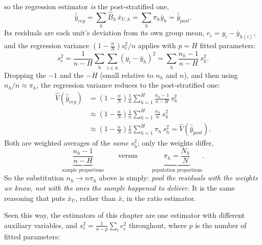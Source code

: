 \documentclass[
  letterpaper,
  DIV=11,
  numbers=noendperiod]{scrreprt}
\renewcommand{\[}{\begin{equation}}
\renewcommand{\]}{\end{equation}}
\begin{document}
so the regression estimator \emph{is} the post-stratified one, \[
\hat{\bar y}_{reg} = \sum_h \hat B_h\,\bar x_{U,h} = \sum_h \pi_h\bar y_h = \hat{\bar y}_{post} .
\] Its residuals are each unit's deviation from its own group mean,
\(e_i = y_i - \bar y_{h(i)}\), and the regression variance
\(\left(1 - \frac nN\right)s_e^2/n\) applies with \(p = H\) fitted
parameters: \[
s_e^2 = \frac{1}{n-H}\sum_h\sum_{i \in h}\left(y_i - \bar y_h\right)^2 = \sum_h \frac{n_h - 1}{n-H}\,s_h^2 .
\] Dropping the \(-1\) and the \(-H\) (small relative to \(n_h\) and
\(n\)), and then using \(n_h/n \approx \pi_h\), the regression variance
reduces to the post-stratified one: \[
\begin{aligned}
\hat V(\hat{\bar y}_{reg})
&= \left(1 - \frac nN\right)\frac1n\sum_{h=1}^H \frac{n_h - 1}{n-H}\,s_h^2 \\
&\approx \left(1 - \frac nN\right)\frac1n\sum_{h=1}^H \frac{n_h}{n}\,s_h^2 \\
&\approx \left(1 - \frac nN\right)\frac1n\sum_{h=1}^H \pi_h\,s_h^2
= \hat V(\hat{\bar y}_{post}) .
\end{aligned}
\] Both are weighted averages of the \emph{same} \(s_h^2\); only the
weights differ, \[
\underbrace{\frac{n_h - 1}{n - H}}_{\text{sample proportions}}
\qquad\text{versus}\qquad
\underbrace{\pi_h = \frac{N_h}{N}}_{\text{population proportions}} .
\] So the substitution \(n_h \to n\pi_h\) above is simply: \emph{pool
the residuals with the weights we know, not with the ones the sample
happened to deliver.} It is the same reasoning that puts \(\bar x_U\),
rather than \(\bar x\), in the ratio estimator.

Seen this way, the estimators of this chapter are one estimator with
different auxiliary variables, and \(s_e^2 = \frac{1}{n-p}\sum_i e_i^2\)
throughout, where \(p\) is the number of fitted parameters:
\end{document}
